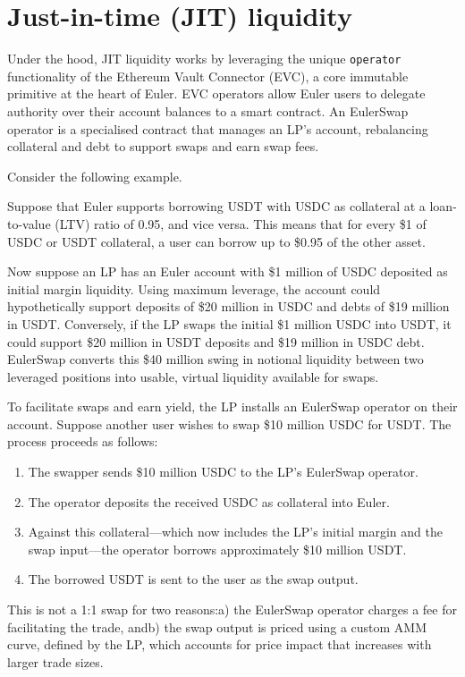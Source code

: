 \documentclass{article}
\begin{document}
\section{Just-in-time (JIT) liquidity}

Under the hood, JIT liquidity works by leveraging the unique \texttt{operator} functionality of the Ethereum Vault Connector (EVC), a core immutable primitive at the heart of Euler. EVC operators allow Euler users to delegate authority over their account balances to a smart contract. An EulerSwap operator is a specialised contract that manages an LP’s account, rebalancing collateral and debt to support swaps and earn swap fees.

Consider the following example.

Suppose that Euler supports borrowing USDT with USDC as collateral at a loan-to-value (LTV) ratio of 0.95, and vice versa. This means that for every \$1 of USDC or USDT collateral, a user can borrow up to \$0.95 of the other asset.

Now suppose an LP has an Euler account with \$1 million of USDC deposited as initial margin liquidity. Using maximum leverage, the account could hypothetically support deposits of \$20 million in USDC and debts of \$19 million in USDT. Conversely, if the LP swaps the initial \$1 million USDC into USDT, it could support \$20 million in USDT deposits and \$19 million in USDC debt. EulerSwap converts this \$40 million swing in notional liquidity between two leveraged positions into usable, virtual liquidity available for swaps.

To facilitate swaps and earn yield, the LP installs an EulerSwap operator on their account. Suppose another user wishes to swap \$10 million USDC for USDT. The process proceeds as follows:

\begin{enumerate}
\item The swapper sends \$10 million USDC to the LP’s EulerSwap operator.
\item The operator deposits the received USDC as collateral into Euler.
\item Against this collateral—which now includes the LP’s initial margin and the swap input—the operator borrows approximately \$10 million USDT.
\item The borrowed USDT is sent to the user as the swap output.
\end{enumerate}

\quad
This is not a 1:1 swap for two reasons:a) the EulerSwap operator charges a fee for facilitating the trade, andb) the swap output is priced using a custom AMM curve, defined by the LP, which accounts for price impact that increases with larger trade sizes.
\end{document}
